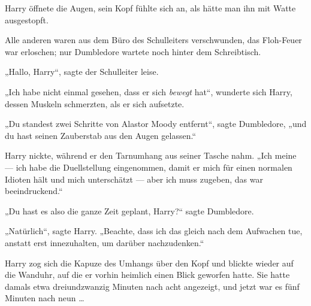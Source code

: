 \later

Harry öffnete die Augen, sein Kopf fühlte sich an, als hätte man ihn mit Watte ausgestopft.

Alle anderen waren aus dem Büro des Schulleiters verschwunden, das Floh-Feuer war erloschen; nur Dumbledore wartete noch hinter dem Schreibtisch.

„Hallo, Harry“, sagte der Schulleiter leise.

„Ich habe nicht einmal gesehen, dass er sich \emph{bewegt} hat“, wunderte sich Harry, dessen Muskeln schmerzten, als er sich aufsetzte.

„Du standest zwei Schritte von Alastor Moody entfernt“, sagte Dumbledore, „und du hast seinen Zauberstab aus den Augen gelassen.“

Harry nickte, während er den Tarnumhang aus seiner Tasche nahm.
„Ich meine — ich habe die Duellstellung eingenommen, damit er mich für einen normalen Idioten hält und mich unterschätzt — aber ich muss zugeben, das war beeindruckend.“

„Du hast es also die ganze Zeit geplant, Harry?“ sagte Dumbledore.

„Natürlich“, sagte Harry.
„Beachte, dass ich das gleich nach dem Aufwachen tue, anstatt erst innezuhalten, um darüber nachzudenken.“


Harry zog sich die Kapuze des Umhangs über den Kopf und blickte wieder auf die Wanduhr, auf die er vorhin heimlich einen Blick geworfen hatte. Sie hatte damals etwa dreiundzwanzig Minuten nach acht angezeigt, und jetzt war es fünf Minuten nach neun …

